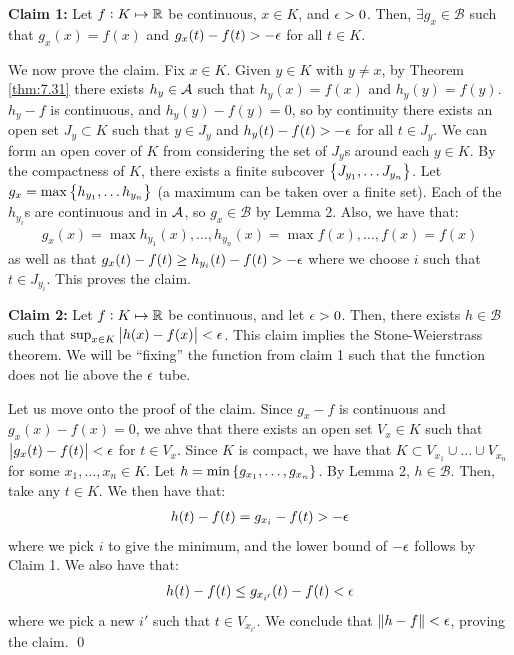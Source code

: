 \begin{nproof}
    \textbf{Claim 1:} Let $f: K \mapsto \mathbb{R}$ be continuous, $x \in K$, and $\epsilon > 0$. Then, $\exists g_x \in \mathcal{B}$ such that $g_x(x) = f(x)$ and $g_x(t) - f(t) > -\epsilon$ for all $t \in K$.

    We now prove the claim. Fix $x \in K$. Given $y \in K$ with $y \neq x$, by Theorem \ref{thm:7.31} there exists $h_y \in \mathcal{A}$ such that $h_y(x) = f(x)$ and $h_y(y) = f(y)$. $h_y - f$ is continuous, and $h_y(y) - f(y) = 0$, so by continuity there exists an open set $J_y \subset K$ such that $y \in J_y$ and $h_y(t) - f(t) > -\epsilon$ for all $t \in J_y$. We can form an open cover of $K$ from considering the set of $J_y$s around each $y \in K$. By the compactness of $K$, there exists a finite subcover $\set{J_{y_1}, \ldots J_{y_n}}$. Let $g_x = \max\set{h_{y_1}, \ldots h_{y_n}}$ (a maximum can be taken over a finite set). Each of the $h_{y_i}$s are continuous and in $\mathcal{A}$, so $g_x \in \mathcal{B}$ by Lemma 2. Also, we have that:
    \begin{align*}
        g_x(x) = \max{h_{y_1}(x), \ldots, h_{y_n}(x)} = \max{f(x), \ldots, f(x)} = f(x)
    \end{align*}
    as well as that $g_x(t) - f(t) \geq h_{y_i}(t) - f(t) > -\epsilon$ where we choose $i$ such that $t \in J_{y_i}$. This proves the claim.

    \textbf{Claim 2:} Let $f: K \mapsto \mathbb{R}$ be continuous, and let $\epsilon > 0$. Then, there exists $h \in \mathcal{B}$ such that $\sup_{x \in K}\abs{h(x) - f(x)} < \epsilon$. This claim implies the Stone-Weierstrass theorem. We will be ``fixing'' the function from claim 1 such that the function does not lie above the $\epsilon$ tube. 

    Let us move onto the proof of the claim. Since $g_x - f$ is continuous and $g_x(x) - f(x) = 0$, we ahve that there exists an open set $V_x \in K$ such that $\abs{g_x(t) - f(t)} < \epsilon$ for $t \in V_x$. Since $K$ is compact, we have that $K \subset V_{x_1} \cup \ldots \cup V_{x_n}$ for some $x_1, \ldots, x_n \in K$. Let $h = \min\set{g_{x_1}, \ldots, g_{x_n}}$. By Lemma 2, $h \in \mathcal{B}$. Then, take any $t \in K$. We then have that:
    \begin{align*}
        h(t) - f(t) = g_{x_i} - f(t) > -\epsilon
    \end{align*}
    where we pick $i$ to give the minimum, and the lower bound of $-\epsilon$ follows by Claim 1. We also have that:
    \begin{align*}
        h(t) - f(t) \leq g_{x_{i'}}(t) - f(t) < \epsilon
    \end{align*}
    where we pick a new $i'$ such that $t \in V_{x_{i'}}$. We conclude that $\norm{h - f} < \epsilon$, proving the claim. \qed
\end{nproof}

